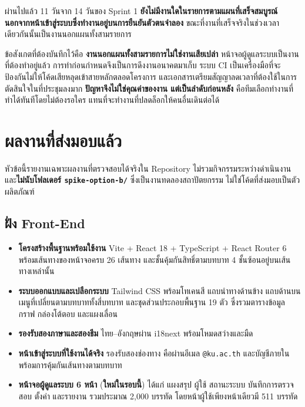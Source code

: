 \vspace{0.8em}
\noindent ผ่านไปแล้ว 11 วันจาก 14 วันของ Sprint 1 \textbf{ยังไม่มีงานใดในรายการตามแผนที่เสร็จสมบูรณ์ นอกจากหน้าเข้าสู่ระบบซึ่งทำงานอยู่บนการยืนยันตัวตนจำลอง} ขณะที่งานที่เสร็จจริงในช่วงเวลาเดียวกันนั้นเป็นงานนอกแผนทั้งสามรายการ

ข้อสังเกตที่ต้องบันทึกไว้คือ \textbf{งานนอกแผนทั้งสามรายการไม่ใช่งานเสียเปล่า} หน้าจอผู้ดูแลระบบเป็นงานที่ต้องทำอยู่แล้ว การทำก่อนกำหนดจึงเป็นการดึงงานอนาคตมาเก็บ ระบบ CI เป็นเครื่องมือที่จะป้องกันไม่ให้โค้ดเสียหลุดเข้าสายหลักตลอดโครงการ และเอกสารเตรียมสัญญาลดเวลาที่ต้องใช้ในการตัดสินใจในที่ประชุมลงมาก \textbf{ปัญหาจึงไม่ใช่คุณค่าของงาน แต่เป็นลำดับก่อนหลัง} คือทีมเลือกทำงานที่ทำได้ทันทีโดยไม่ต้องรอใคร แทนที่จะทำงานที่ปลดล็อกให้คนอื่นเดินต่อได้

\clearpage
\section{ผลงานที่ส่งมอบแล้ว}

หัวข้อนี้รายงานเฉพาะผลงานที่ตรวจสอบได้จริงใน Repository ไม่รวมกิจกรรมระหว่างดำเนินงาน และ\textbf{ไม่นับโฟลเดอร์ \texttt{spike-option-b/}} ซึ่งเป็นงานทดลองสถาปัตยกรรม ไม่ใช่โค้ดที่ส่งมอบเป็นตัวผลิตภัณฑ์

\subsection{ฝั่ง Front-End}

\begin{itemize}
  \item \textbf{โครงสร้างพื้นฐานพร้อมใช้งาน} Vite + React 18 + TypeScript + React Router 6 พร้อมเส้นทางของหน้าจอครบ 26 เส้นทาง และชั้นคุ้มกันสิทธิ์ตามบทบาท 4 ชั้นซ้อนอยู่บนเส้นทางเหล่านั้น
  \item \textbf{ระบบออกแบบและเปลือกระบบ} Tailwind CSS พร้อมโทเคนสี แถบนำทางด้านข้าง แถบด้านบน เมนูที่เปลี่ยนตามบทบาททั้งสี่บทบาท และชุดส่วนประกอบพื้นฐาน 19 ตัว ซึ่งรวมตารางข้อมูล กราฟ กล่องโต้ตอบ และแผงเลื่อน
  \item \textbf{รองรับสองภาษาและสองธีม} ไทย–อังกฤษผ่าน i18next พร้อมโหมดสว่างและมืด
  \item \textbf{หน้าเข้าสู่ระบบที่ใช้งานได้จริง} รองรับสองช่องทาง คือผ่านอีเมล \texttt{@ku.ac.th} และบัญชีภายใน พร้อมการคุ้มกันเส้นทางตามบทบาท
  \item \textbf{หน้าจอผู้ดูแลระบบ 6 หน้า} (\textbf{ใหม่ในรอบนี้}) ได้แก่ แผงสรุป ผู้ใช้ สถานะระบบ บันทึกการตรวจสอบ ตั้งค่า และรายงาน รวมประมาณ 2{,}000 บรรทัด โดยหน้าผู้ใช้เพียงหน้าเดียวมี 511 บรรทัด
\end{itemize}

